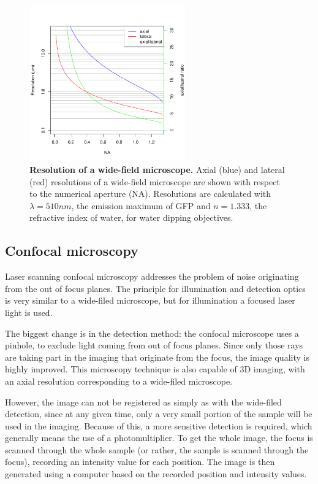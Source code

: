 \documentclass{diploma_style}
\begin{document}
\begin{figure}[htpb]
    \centering
    \includegraphics[width=0.6\textwidth]{figures/1_spim/resolution}
    \caption{\textbf{Resolution of a wide-field microscope.} Axial (blue) and lateral (red) resolutions of a wide-field microscope are shown with respect to the numerical aperture (NA). Resolutions are calculated with $\lambda =510nm$, the emission maximum of GFP and $n=1.333$, the refractive index of water, for water dipping objectives.}
    \label{fig:resolution}
\end{figure}

\subsection{Confocal microscopy}

Laser scanning confocal microscopy \cite{davidovits_photomicrography_1973} addresses the problem of noise originating from the out of focus planes. The principle for illumination and detection optics is very similar to a wide-filed microscope, but for illumination a focused laser light is used.

The biggest change is in the detection method: the confocal microscope uses a pinhole, to exclude light coming from out of focus planes. Since only those rays are taking part in the imaging that originate from the focus, the image quality is highly improved. This microscopy technique is also capable of 3D imaging, with an axial resolution corresponding to a wide-filed microscope.

However, the image can not be registered as simply as with the wide-filed detection, since at any given time, only a very small portion of the sample will be used in the imaging. Because of this, a more sensitive detection is required, which generally means the use of a photomultiplier. To get the whole image, the focus is scanned through the whole sample (or rather, the sample is scanned through the focus), recording an intensity value for each position. The image is then generated using a computer based on the recorded position and intensity values.
\end{document}
